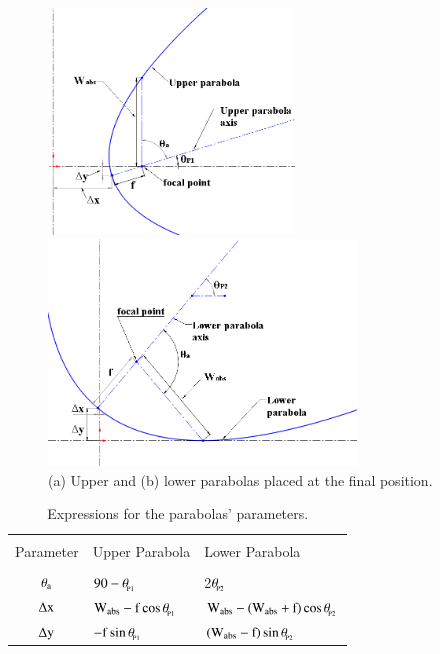 \begin{figure}[ht!]
	\begin{minipage}{0.49\columnwidth}
		\includegraphics[width=0.9\columnwidth,height=6.0cm]{figs/upper_parabola.PNG}
	\end{minipage}
	\begin{minipage}{0.49\columnwidth}
		\includegraphics[width=0.9\columnwidth,height=6.0cm]{figs/lower_parabola.PNG}
	\end{minipage}
	\caption{(a) Upper and (b) lower parabolas placed at the final position.}
	\label{rottrans_two}
\end{figure}

\begin{table}[!ht]
	\centering
	\caption{Expressions for the parabolas' parameters.}
	\begin{tabular}{cp{3.3cm}l}
		\hline \\[-12pt]
		\vspace*{0.1cm} Parameter & Upper Parabola & Lower Parabola \\ [0pt]
		\hline \\[-12pt]
		$\theta_{{\rm{a}}}$ & $90 -\theta_{\!_{\rm{P1}}}$ & 2$\theta_{\!_{\rm{P2}}}$ \\ [5pt]
		$\Delta \rm{x}$ & $\rm{{W_{abs}} - f\cos {\theta_{\!_{P1}}}}$ & $\rm{{W_{abs}} - ({W_{abs}} + f)\cos {\theta_{\!_{P2}}}}$ \\ [5pt]
		$\Delta \rm{y}$ & $\rm{- f\sin {\theta_{\!_{P1}}}}$ & $\rm{({W_{abs}} - f)\sin {\theta_{\!_{P2}}}}$ \\ 
		\hline 
	\end{tabular}
	\label{parabolas}
\end{table}

